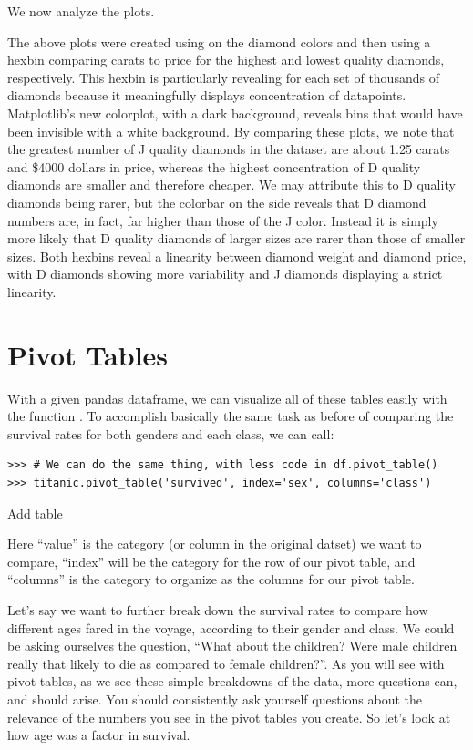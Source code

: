 We now analyze the plots.

The above plots were created using  on the diamond colors and then using a hexbin comparing carats to price for the highest and lowest quality diamonds, respectively. 
This hexbin is particularly revealing for each set of thousands of diamonds because it meaningfully displays concentration of datapoints. 
Matplotlib's new  colorplot, with a dark background, reveals bins that would have been invisible with a white background.
By comparing these plots, we note that the greatest number of J quality diamonds in the dataset are about 1.25 carats and \$4000 dollars in price, whereas the highest concentration of D quality diamonds are smaller and therefore cheaper. 
We may attribute this to D quality diamonds being rarer, but the colorbar on the side reveals that D diamond numbers are, in fact, far higher than those of the J color. 
Instead it is simply more likely that D quality diamonds of larger sizes are rarer than those of smaller sizes. 
Both hexbins reveal a linearity between diamond weight and diamond price, with D diamonds showing more variability and J diamonds displaying a strict linearity.

\section*{Pivot Tables}
With a given pandas dataframe, we can visualize all of these tables easily with the function . To accomplish basically the same task as before of comparing the survival rates for both genders and each class, we can call:

\begin{lstlisting}
>>> # We can do the same thing, with less code in df.pivot_table()
>>> titanic.pivot_table('survived', index='sex', columns='class')
\end{lstlisting}

Add table

Here ``value'' is the category (or column in the original datset) we want to compare, ``index'' will be the category for the row of our pivot table, and ``columns'' is the category to organize as the columns for our pivot table.

Let's say we want to further break down the survival rates to compare how different ages fared in the voyage, according to their gender and class. We could be asking ourselves the question, ``What about the children? Were male children really that likely to die as compared to female children?''. As you will see with pivot tables, as we see these simple breakdowns of the data, more questions can, and should arise. You should consistently ask yourself questions about the relevance of the numbers you see in the pivot tables you create. So let's look at how age was a factor in survival.

